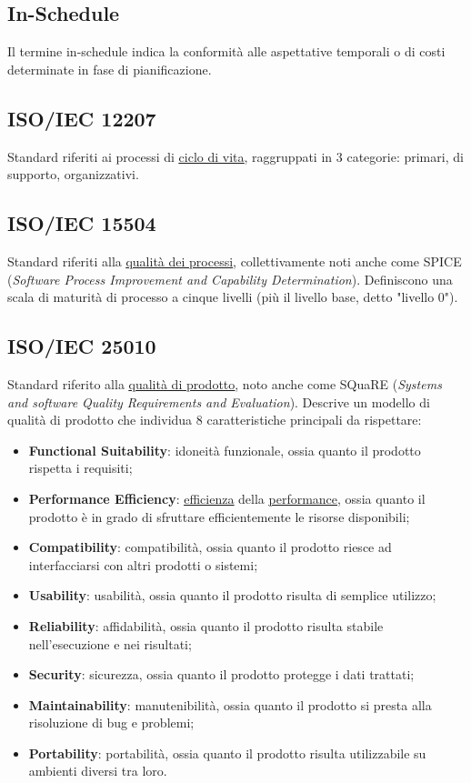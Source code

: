 	\subsection{In-Schedule}
	\label{sec:inschedule}
	Il termine in-schedule indica la conformità alle aspettative temporali o di costi determinate in fase di pianificazione.


	\subsection{ISO/IEC 12207}
	\label{sec:iso12207}
	Standard riferiti ai processi di \underline{\hyperref[sec:ciclodivita]{ciclo di vita}}, raggruppati in 3 categorie: primari, di supporto, organizzativi.


	\subsection{ISO/IEC 15504}
	\label{sec:iso15504}
	Standard riferiti alla \underline{\hyperref[sec:qualitaprocessi]{qualità dei processi}}, collettivamente noti anche come SPICE (\emph{Software Process Improvement and Capability Determination}). Definiscono una scala di maturità di processo a cinque livelli (più il livello base, detto "livello 0").


	\subsection{ISO/IEC 25010}
	\label{sec:iso25010d}
	Standard riferito alla \underline{\hyperref[sec:qualitaprodotto]{qualità di prodotto}}, noto anche come SQuaRE (\emph{Systems and software Quality Requirements and Evaluation}). Descrive un modello di qualità di prodotto che individua 8 caratteristiche principali da rispettare: \begin{itemize}
	\item \textbf{Functional Suitability}: idoneità funzionale, ossia quanto il prodotto rispetta i requisiti;
	\item \textbf{Performance Efficiency}: \underline{\hyperref[sec:efficienza]{efficienza}} della \underline{\hyperref[sec:performance]{performance}}, ossia quanto il prodotto è in grado di sfruttare efficientemente le risorse disponibili;
	\item \textbf{Compatibility}: compatibilità, ossia quanto il prodotto riesce ad interfacciarsi con altri prodotti o sistemi;
	\item \textbf{Usability}: usabilità, ossia quanto il prodotto risulta di semplice utilizzo;
	\item \textbf{Reliability}: affidabilità, ossia quanto il prodotto risulta stabile nell'esecuzione e nei risultati;
	\item \textbf{Security}: sicurezza, ossia quanto il prodotto protegge i dati trattati;
	\item \textbf{Maintainability}: manutenibilità, ossia quanto il prodotto si presta alla risoluzione di bug e problemi;
	\item \textbf{Portability}: portabilità, ossia quanto il prodotto risulta utilizzabile su ambienti diversi tra loro.
	\end{itemize}

